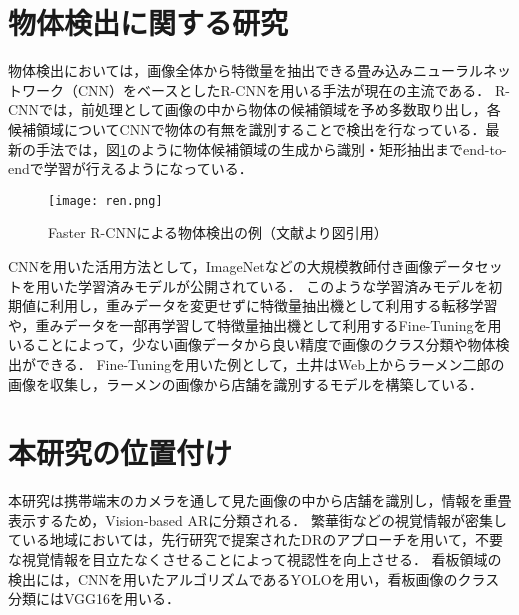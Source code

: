 \section{物体検出に関する研究}
  物体検出においては，画像全体から特徴量を抽出できる畳み込みニューラルネットワーク（CNN）\cite{Lecun:1998}をベースとしたR-CNN\cite{Girshick:2014}を用いる手法が現在の主流である\cite{Nakayama:2015}．
  R-CNNでは，前処理として画像の中から物体の候補領域を予め多数取り出し，各候補領域についてCNNで物体の有無を識別することで検出を行なっている．最新の手法では，図\ref{figure:ren}のように物体候補領域の生成から識別・矩形抽出までend-to-endで学習が行えるようになっている\cite{Redmon:2017, Ren:2017}．
  \begin{figure}[tb]
    \centerline{\texttt{[image: ren.png]}}
    \caption{Faster R-CNNによる物体検出の例（文献\cite{Ren:2017}より図引用）}
    \label{figure:ren}
  \end{figure}

  CNNを用いた活用方法として，ImageNet\cite{Deng:2009}などの大規模教師付き画像データセットを用いた学習済みモデルが公開されている．
  このような学習済みモデルを初期値に利用し，重みデータを変更せずに特徴量抽出機として利用する転移学習や，重みデータを一部再学習して特徴量抽出機として利用するFine-Tuningを用いることによって，少ない画像データから良い精度で画像のクラス分類や物体検出ができる．
  Fine-Tuningを用いた例として，土井はWeb上からラーメン二郎の画像を収集し，ラーメンの画像から店舗を識別するモデルを構築している\cite{Doi:2018}．

\section{本研究の位置付け}
  本研究は携帯端末のカメラを通して見た画像の中から店舗を識別し，情報を重畳表示するため，Vision-based ARに分類される．
  繁華街などの視覚情報が密集している地域においては，先行研究\cite{Fujita:2013}で提案されたDRのアプローチを用いて，不要な視覚情報を目立たなくさせることによって視認性を向上させる．
  看板領域の検出には，CNNを用いたアルゴリズムであるYOLO\cite{Redmon:2017}を用い，看板画像のクラス分類にはVGG16\cite{Simonyan:2015}を用いる．